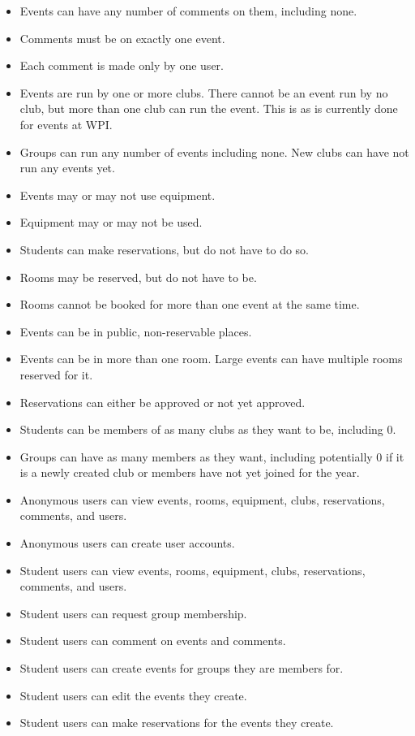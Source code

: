 \documentclass{article}
\begin{document}
\begin{itemize}
\item Events can have any number of comments on them, including none.
\item Comments must be on exactly one event.
\item Each comment is made only by one user.
\item Events are run by one or more clubs. There cannot be an event run by no
club, but more than one club can run the event. This is as is currently done for
events at WPI.  
\item Groups can run any number of events including none. New clubs can have not
run any events yet. 
\item Events may or may not use equipment.
\item Equipment may or may not be used.
\item Students can make reservations, but do not have to do so.
\item Rooms may be reserved, but do not have to be.
\item Rooms cannot be booked for more than one event at the same time. 
\item Events can be in public, non-reservable places.
\item Events can be in more than one room. Large events can have multiple rooms
reserved for it.
\item Reservations can either be approved or not yet approved.
\item Students can be members of as many clubs as they want to be, including 0.
\item Groups can have as many members as they want, including potentially 0 if
it is a newly created club or members have not yet joined for the year.
\item Anonymous users can view events, rooms, equipment, clubs, reservations, comments, and users.
\item Anonymous users can create user accounts.
\item Student users can view events, rooms, equipment, clubs, reservations, comments, and users.
\item Student users can request group membership.
\item Student users can comment on events and comments.
\item Student users can create events for groups they are members for.
\item Student users can edit the events they create.
\item Student users can make reservations for the events they create.

\end{itemize}
\end{document}
